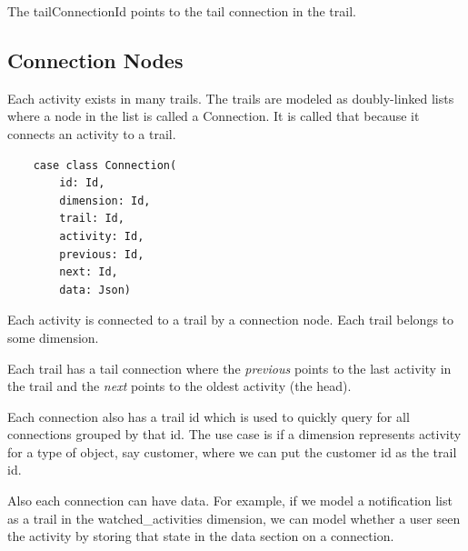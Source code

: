 \documentclass[11pt]{article}
\begin{document}
The tailConnectionId points to the tail connection in the trail.

\subsection{Connection Nodes}

Each activity exists in many trails. The trails are modeled as doubly-linked lists where
a node in the list is called a Connection. It is called that because it connects an activity to a trail.

\begin{lstlisting}
    case class Connection(
        id: Id, 
        dimension: Id, 
        trail: Id,
        activity: Id, 
        previous: Id, 
        next: Id, 
        data: Json)
\end{lstlisting}

Each activity is connected to a trail by a connection node. Each trail belongs to some dimension. 

Each trail has a tail connection where the \emph{previous} points to the last activity in the trail 
and the \emph{next} points to the oldest activity (the head).

Each connection also has a trail id which is used to quickly query for all connections grouped
by that id. The use case is if a dimension represents activity for a type of object, say customer,
where we can put the customer id as the trail id. 

Also each connection can have data. For example, if we model a notification list as a trail in the
watched\_activities dimension, we can model whether a user seen the activity by storing
that state in the data section on a connection.
\end{document}
